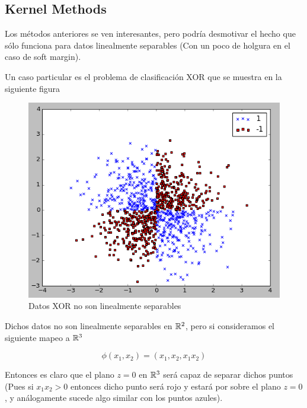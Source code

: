 \subsection{Kernel Methods}

Los métodos anteriores se ven interesantes, pero podría desmotivar el hecho que sólo funciona para datos linealmente separables (Con un poco de holgura en el caso de soft margin). 

Un caso particular es el problema de clasificación XOR que se muestra en la siguiente figura

\begin{figure}[ht]
    \centering
    \includegraphics[scale=0.4]{img/xor.png}
    \caption{Datos XOR no son linealmente separables}
    \label{fig:my_label5}
\end{figure}

Dichos datos no son linealmente separables en ${\mathbb R}^2$, pero si consideramos el siguiente mapeo a ${\mathbb R}^3$

\begin{equation}
    \phi(x_1, x_2) = (x_1, x_2, x_1 x_2)
\end{equation}

Entonces es claro que el plano $z=0$ en ${\mathbb R}^3$ será capaz de separar dichos puntos (Pues si $x_1 x_2 > 0$ entonces dicho punto será rojo y estará por sobre el plano $z=0$, y análogamente sucede algo similar con los puntos azules). 

